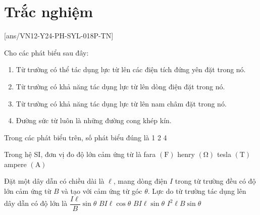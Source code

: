 \let\lesson\undefined
\newcommand{\lesson}{\phantomlesson{Bài 9.}}
\let\lesson\undefined
\newcommand{\lesson}{\phantomlesson{Bài 9.}}


\setcounter{section}{2}
\section{Trắc nghiệm}
\setcounter{ex}{0}
[ans/VN12-Y24-PH-SYL-018P-TN]
\begin{ex}
Cho các phát biểu sau đây:
\begin{enumerate}[label=(\arabic*)]
	\item Từ trường có thể tác dụng lực từ lên các điện tích đứng yên đặt trong nó.
	\item Từ trường có khả năng tác dụng lực từ lên dòng điện đặt trong nó.
	\item Từ trường có khả năng tác dụng lực từ lên nam châm đặt trong nó.
	\item Đường sức từ luôn là những đường cong khép kín.
\end{enumerate}	
Trong các phát biểu trên, số phát biểu đúng là
	\choice
	{1}
	{2}
	{}
	{4}
\end{ex}

\begin{ex}
Trong hệ SI, đơn vị đo độ lớn cảm ứng từ là 	
	\choice
	{fara $\left(\si{\farad}\right)$}
	{henry $\left(\si{\ohm}\right)$}
	{\True tesla $\left(\si{\tesla}\right)$}
	{ampere $\left(\si{\ampere}\right)$}
	\loigiai{}
\end{ex}
\begin{ex}
Đặt một dây dẫn có chiều dài là $\ell$, mang dòng điện $I$ trong từ trường đều có độ lớn cảm ứng từ $B$ và tạo với cảm ứng từ góc $\theta$. Lực do từ trường tác dụng lên dây dẫn có độ lớn là
	\choice
	{$\dfrac{I\ell}{B}\sin\theta$}
	{$BI\ell \cos\theta$}
	{\True $BI\ell\sin\theta$}
	{$I^2\ell B\sin\theta$}
	\loigiai{}
\end{ex}



